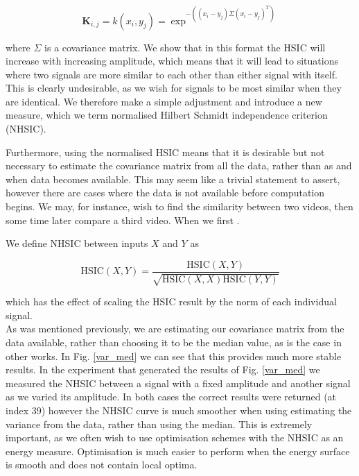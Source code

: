 \begin{equation}
\textbf{K}_{i,j} = k(x_i,y_j) = \exp^{-((x_i-y_j)\Sigma(x_i-y_j)^T)}
\end{equation}

\noindent where $\Sigma$ is a covariance matrix. We show that in this format the HSIC will increase with increasing amplitude, which means that it will lead to situations where two signals are more similar to each other than either signal with itself. This is clearly undesirable, as we wish for signals to be most similar when they are identical. We therefore make a simple adjustment and introduce a new measure, which we term normalised Hilbert Schmidt independence criterion (NHSIC).

Furthermore, using the normalised HSIC means that it is desirable but not necessary to estimate the covariance matrix from all the data, rather than as and when data becomes available. This may seem like a trivial statement to assert, however there are cases where the data is not available before computation begins. We may, for instance, wish to find the similarity between two videos, then some time later compare a third video. When we first . 



 We define NHSIC between inputs $X$ and $Y$ as 

\begin{equation}
\text{HSIC}(X,Y) = \frac{\text{HSIC}(X,Y)}{\sqrt{\text{HSIC}(X,X)\text{HSIC}(Y,Y)}}
\end{equation}

\noindent which has the effect of scaling the HSIC result by the norm of each individual signal. \\

As was mentioned previously, we are estimating our covariance matrix from the data available, rather than choosing it to be the median value, as is the case in other works. In Fig. \ref{var_med} we can see that this provides much more stable results. In the experiment that generated the results of Fig. \ref{var_med} we measured the NHSIC between a signal with a fixed amplitude and another signal as we varied its amplitude. In both cases the correct results were returned (at index 39) however the NHSIC curve is much smoother when using estimating the variance from the data, rather than using the median. This is extremely important, as we often wish to use optimisation schemes with the NHSIC as an energy measure. Optimisation is much easier to perform when the energy surface is smooth and does not contain local optima. \\

